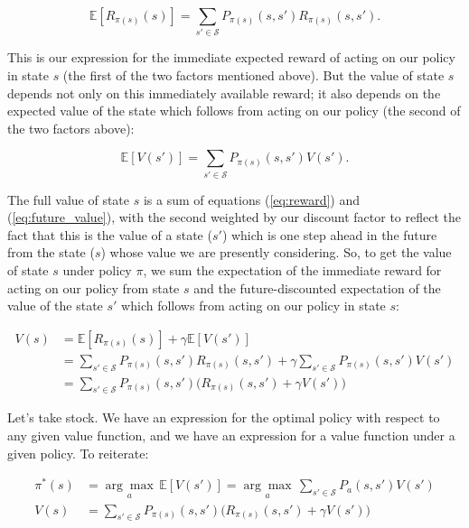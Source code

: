 \documentclass[12pt]{article}
\begin{document}
\begin{equation}
\label{eq:reward} \mathbb{E}[R_{\pi(s)}(s)] = \sum_{s' \in \mathscr{S}} P_{\pi(s)}(s, s') R_{\pi(s)}(s, s').
\end{equation}

This is our expression for the immediate expected reward of acting on our policy in state $s$ (the first of the two factors mentioned above). But the value of state $s$ depends not only on this immediately available reward; it also depends on the expected value of the state which follows from acting on our policy (the second of the two factors above):

\begin{equation}
\label{eq:future_value} \mathbb{E}[V(s')] = \sum_{s' \in \mathscr{S}} P_{\pi(s)}(s, s') V(s').
\end{equation}

The full value of state $s$ is a sum of equations (\ref{eq:reward}) and (\ref{eq:future_value}), with the second weighted by our discount factor to reflect the fact that this is the value of a state ($s'$) which is one step ahead in the future from the state ($s$) whose value we are presently considering. So, to get the value of state $s$ under policy $\pi$, we sum the expectation of the immediate reward for acting on our policy from state $s$ and the future-discounted expectation of the value of the state $s'$ which follows from acting on our policy in state $s$:

\begin{align}
V(s) &= \mathbb{E}[R_{\pi(s)}(s)] + \gamma \mathbb{E}[V(s')] \\[5pt]
&= \sum_{s' \in \mathscr{S}} P_{\pi(s)}(s, s') R_{\pi(s)}(s, s') + \gamma \sum_{s' \in \mathscr{S}} P_{\pi(s)}(s, s') V(s') \\[5pt]
&= \sum_{s' \in \mathscr{S}} P_{\pi(s)}(s, s') \Big(R_{\pi(s)}(s, s') + \gamma V(s')\Big)
\end{align}

Let's take stock. We have an expression for the optimal policy with respect to any given value function, and we have an expression for a value function under a given policy. To reiterate:

\begin{align}
\pi^*(s) &= \underset{a}{\arg\max} \, \mathbb{E}[V(s')] = \underset{a}{\arg\max} \, \sum_{s' \in \mathscr{S}} P_a(s, s') V(s') \\[5pt]
V(s) &= \sum_{s' \in \mathscr{S}} P_{\pi(s)}(s, s') \Big(R_{\pi(s)}(s, s') + \gamma V(s')\Big)
\end{align}
\end{document}
